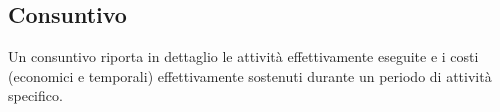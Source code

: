 \subsection{Consuntivo}
Un consuntivo riporta in dettaglio le attività effettivamente eseguite e i costi (economici e temporali) effettivamente sostenuti durante un periodo di attività specifico.  
